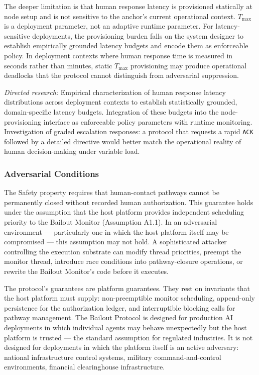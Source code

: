 The deeper limitation is that human response latency is provisioned statically
at node setup and is not sensitive to the anchor's current operational context.
$T_{\max}$ is a deployment parameter, not an adaptive runtime parameter.  For
latency-sensitive deployments, the provisioning burden falls on the system
designer to establish empirically grounded latency budgets and encode them as
enforceable policy.  In deployment contexts where human response time is
measured in seconds rather than minutes, static $T_{\max}$ provisioning may
produce operational deadlocks that the protocol cannot distinguish from
adversarial suppression.

\textit{Directed research:} Empirical characterization of human response
latency distributions across deployment contexts to establish statistically
grounded, domain-specific latency budgets.  Integration of these budgets into
the node-provisioning interface as enforceable policy parameters with runtime
monitoring.  Investigation of graded escalation responses: a protocol that
requests a rapid \texttt{ACK} followed by a detailed directive would better
match the operational reality of human decision-making under variable load.

\subsubsection{Adversarial Conditions}\label{sec:adversarial-conditions}

The Safety property requires that human-contact pathways cannot be permanently
closed without recorded human authorization.  This guarantee holds under the
assumption that the host platform provides independent scheduling priority to
the Bailout Monitor (Assumption A1.1).  In an adversarial environment ---
particularly one in which the host platform itself may be compromised --- this
assumption may not hold.  A sophisticated attacker controlling the execution
substrate can modify thread priorities, preempt the monitor thread, introduce
race conditions into pathway-closure operations, or rewrite the Bailout
Monitor's code before it executes.

The protocol's guarantees are platform guarantees.  They rest on invariants
that the host platform must supply: non-preemptible monitor scheduling,
append-only persistence for the authorization ledger, and interruptible
blocking calls for pathway management.  The Bailout Protocol is designed for
production AI deployments in which individual agents may behave unexpectedly
but the host platform is trusted --- the standard assumption for regulated
industries.  It is not designed for deployments in which the platform itself
is an active adversary: national infrastructure control systems, military
command-and-control environments, financial clearinghouse infrastructure.


